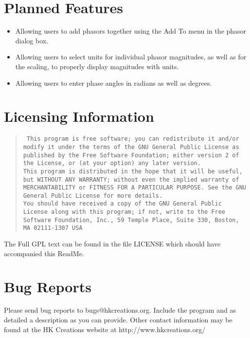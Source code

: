 \documentclass[10pt]{article}
\begin{document}
\section*{Planned Features}
\begin{itemize}
	\item Allowing users to add phasors together using the Add To menu in the phasor dialog box.
	\item Allowing users to select units for individual phasor magnitudes, as well as for the scaling, to properly display magnitudes with units.
	\item Allowing users to enter phase angles in radians as well as degrees.
\end{itemize}

\section*{Licensing Information}
\begin{quotation}
{\tt
\noindent This program is free software; you can redistribute it and/or modify it under the terms of the GNU General Public License as published by the Free Software Foundation; either version 2 of the License, or (at your option) any later version.\\

\noindent This program is distributed in the hope that it will be useful, but WITHOUT ANY WARRANTY; without even the implied warranty of MERCHANTABILITY or FITNESS FOR A PARTICULAR PURPOSE.  See the GNU General Public License for more details. \\

\noindent You should have received a copy of the GNU General Public License along with this program; if not, write to the Free Software Foundation, Inc., 59 Temple Place, Suite 330, Boston, MA  02111-1307  USA
}
\end{quotation}
The Full GPL text can be found in the file LICENSE which should have accompanied this ReadMe.

\section*{Bug Reports}
Please send bug reports to bugs@hkcreations.org. Include the program and as detailed a description as  you can provide. Other contact information may be found at the HK Creations website at http://www.hkcreations.org/
\end{document}
